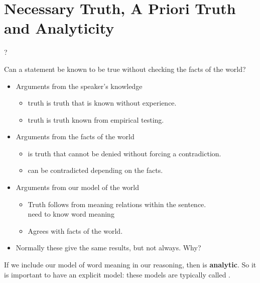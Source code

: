 \documentclass[headrule,footrule]{foils}
\begin{document}
\section{Necessary Truth, A Priori Truth and Analyticity}

\begin{exe}
  \ex {}
  \ex ?
\end{exe}

\noindent Can a statement be known to be true without checking the facts of the
world?

\begin{itemize}
\item Arguments from the speaker's knowledge
\begin{itemize}
\item {} truth is truth that is known without experience.
\item {} truth is truth known from empirical testing.
\end{itemize}
\item Arguments from the facts of the world
  \begin{itemize}
  \item {} is truth that cannot be denied without forcing a
    contradiction.
  \item {} can be contradicted depending on the facts.
  \end{itemize}
\item Arguments from our model of the world
\begin{itemize}
\item {} Truth follows from meaning relations  within the sentence.
\\ need to know word meaning
\item {} Agrees with facts of the world.
\end{itemize}
\item Normally these give the same results, but not always.  Why?
\end{itemize}

If we include our model of word meaning in our reasoning, then  is \textbf{analytic}.  So it is important to have
an explicit model: these models are typically called .
\end{document}
